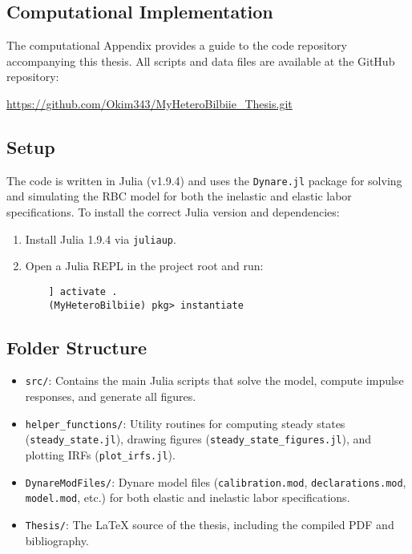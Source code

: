 \documentclass[a4paper,12pt]{article} %
\numberwithin{equation}{section} %
\numberwithin{figure}{section}
\numberwithin{table}{section}
\begin{document}
\begin{refsection}
\begin{appendices}
\pagebreak
\section{Computational Implementation}
\label{sec-app:codes}

The computational Appendix provides a guide to the code repository accompanying this thesis. All scripts and data files are available at the GitHub repository:
\begin{center}
  \url{https://github.com/Okim343/MyHeteroBilbiie_Thesis.git}
\end{center}

\subsection{Setup}

The code is written in Julia (v1.9.4) and uses the \texttt{Dynare.jl} package for solving and simulating the 
RBC model for both the inelastic and elastic labor specifications. To install the correct Julia version and dependencies:

\begin{enumerate}
  \item Install Julia 1.9.4 via \texttt{juliaup}.
  \item Open a Julia REPL in the project root and run:
    \begin{verbatim}
    ] activate .
    (MyHeteroBilbiie) pkg> instantiate
    \end{verbatim}
\end{enumerate}

\subsection{Folder Structure}

\begin{itemize}
  \item \texttt{src/}:  
    Contains the main Julia scripts that solve the model, compute impulse responses, and generate all figures.
  \item \texttt{helper\_functions/}:  
    Utility routines for computing steady states (\texttt{steady\_state.jl}), drawing figures (\texttt{steady\_state\_figures.jl}), and plotting IRFs (\texttt{plot\_irfs.jl}).
  \item \texttt{DynareModFiles/}:  
    Dynare model files (\texttt{calibration.mod}, \texttt{declarations.mod}, \texttt{model.mod}, etc.) for both elastic and inelastic labor specifications.
  \item \texttt{Thesis/}:  
    The \LaTeX{} source of the thesis, including the compiled PDF and bibliography.
\end{itemize}


\end{appendices}
\end{refsection}
\end{document}
